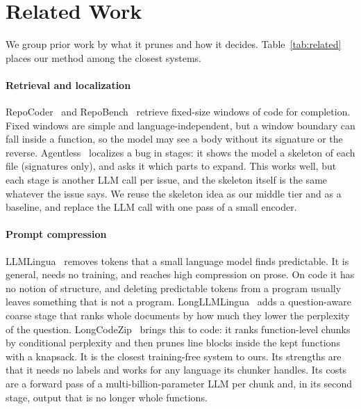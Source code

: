 \section{Related Work}
\label{sec:related}

We group prior work by what it prunes and how it decides. Table~\ref{tab:related} places our method among the closest systems.

\paragraph{Retrieval and localization} RepoCoder~\cite{repocoder} and RepoBench~\cite{repobench} retrieve fixed-size windows of code for completion. Fixed windows are simple and language-independent, but a window boundary can fall inside a function, so the model may see a body without its signature or the reverse. Agentless~\cite{agentless} localizes a bug in stages: it shows the model a skeleton of each file (signatures only), and asks it which parts to expand. This works well, but each stage is another LLM call per issue, and the skeleton itself is the same whatever the issue says. We reuse the skeleton idea as our middle tier and as a baseline, and replace the LLM call with one pass of a small encoder.

\paragraph{Prompt compression} LLMLingua~\cite{llmlingua} removes tokens that a small language model finds predictable. It is general, needs no training, and reaches high compression on prose. On code it has no notion of structure, and deleting predictable tokens from a program usually leaves something that is not a program. LongLLMLingua~\cite{longllmlingua} adds a question-aware coarse stage that ranks whole documents by how much they lower the perplexity of the question. LongCodeZip~\cite{longcodezip} brings this to code: it ranks function-level chunks by conditional perplexity and then prunes line blocks inside the kept functions with a knapsack. It is the closest training-free system to ours. Its strengths are that it needs no labels and works for any language its chunker handles. Its costs are a forward pass of a multi-billion-parameter LLM per chunk and, in its second stage, output that is no longer whole functions.

